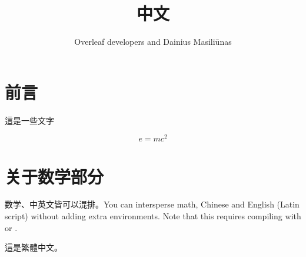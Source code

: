 \documentclass{article}
\title{中文}
\author{Overleaf developers and Dainius Masiliūnas}
\begin{document}
\maketitle

\section{前言}
這是一些文字

$$ e = mc^2 $$

\section{关于数学部分}
数学、中英文皆可以混排。You can intersperse math, Chinese and English (Latin script) without adding extra environments. Note that this requires compiling with  or .

這是繁體中文。
\end{document}
